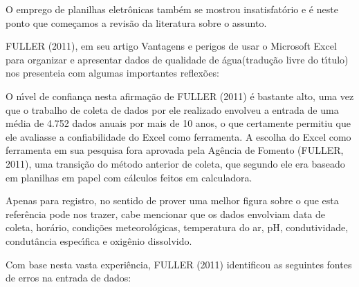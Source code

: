 \documentclass[
12pt,		%
openright,	%
twoside,  %
a4paper,			%
chapter=TITLE,		%
english,			%
french,				%
spanish,			%
brazil				%
]{USPSC-classe/USPSC_RedarTex}
\begin{document}
O emprego de planilhas eletr\^onicas tamb\'em se mostrou insatisfat\'orio e \'e neste ponto que come\c{c}amos a revis\~ao da literatura sobre o assunto.








FULLER (2011), em seu artigo \textquotedbl Vantagens e perigos de usar o Microsoft Excel para organizar e apresentar dados de qualidade de \'agua\textquotedbl  (tradu\c{c}\~ao livre do t\'{\i}tulo) nos presenteia com algumas importantes reflex\~oes:









\noindent\begin{center}\mbox{\centering{}}\end{center}


O n\'{\i}vel de confian\c{c}a nesta afirma\c{c}\~ao de  FULLER (2011) \'e bastante alto, uma vez que o trabalho de coleta de dados por ele realizado envolveu a entrada de uma m\'edia de 4.752 dados anuais por mais de 10 anos, o que certamente permitiu que ele avaliasse a confiabilidade do Excel como ferramenta. A escolha do Excel como ferramenta em sua pesquisa fora aprovada pela Ag\^encia de Fomento  (FULLER, 2011), uma transi\c{c}\~ao do m\'etodo anterior de coleta, que segundo ele era baseado em planilhas em papel com c\'alculos feitos em calculadora.








Apenas para registro, no sentido de prover uma melhor figura sobre o que esta refer\^encia pode nos trazer, cabe mencionar que os dados envolviam data de coleta, hor\'ario, condi\c{c}\~oes meteorol\'ogicas, temperatura do ar, pH, condutividade, condut\^ancia espec\'{\i}fica e oxig\^enio dissolvido.








Com base nesta vasta experi\^encia,  FULLER (2011) identificou as seguintes fontes de erros na entrada de dados:
\end{document}
